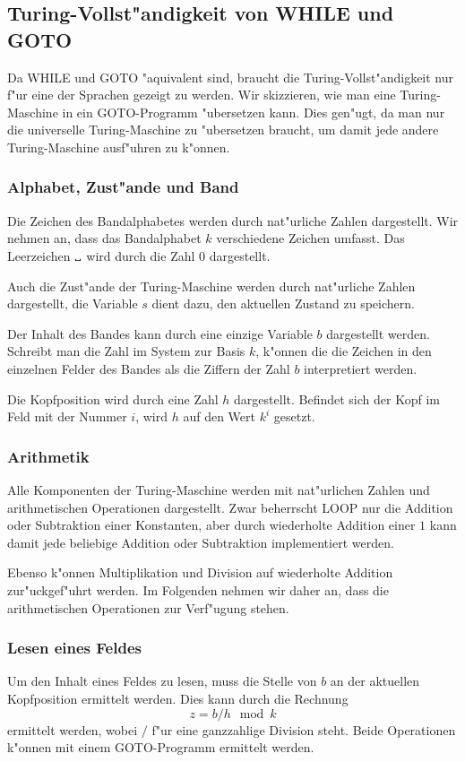 \subsection{Turing-Vollst"andigkeit von WHILE und GOTO}
Da WHILE und GOTO "aquivalent sind, braucht die Turing-Vollst"andigkeit
nur f"ur eine der Sprachen gezeigt zu werden. 
Wir skizzieren, wie man eine Turing-Maschine in ein GOTO-Programm
"ubersetzen kann. Dies gen"ugt, da man nur die universelle
Turing-Maschine zu "ubersetzen braucht, um damit jede andere 
Turing-Maschine ausf"uhren zu k"onnen.

\subsubsection{Alphabet, Zust"ande und Band}
Die Zeichen des Bandalphabetes werden durch nat"urliche Zahlen
dargestellt.  Wir nehmen an, dass das Bandalphabet $k$ verschiedene Zeichen
umfasst. Das Leerzeichen $\text{\textvisiblespace}$ wird durch die Zahl $0$
dargestellt.

Auch die Zust"ande der Turing-Maschine werden durch nat"urliche Zahlen
dargestellt,
die Variable $s$ dient dazu, den aktuellen Zustand zu
speichern.

Der Inhalt des Bandes kann durch eine einzige Variable $b$ dargestellt
werden. Schreibt man die Zahl im System zur Basis $k$, k"onnen die
die Zeichen in den einzelnen Felder des Bandes als die Ziffern 
der Zahl $b$ interpretiert werden.

Die Kopfposition wird durch eine Zahl $h$ dargestellt. Befindet sich
der Kopf im Feld mit der Nummer $i$, wird $h$ auf den Wert $k^i$
gesetzt.

\subsubsection{Arithmetik}
Alle Komponenten der Turing-Maschine werden mit nat"urlichen Zahlen
und arithmetischen Operationen dargestellt.
Zwar beherrscht LOOP nur die Addition oder Subtraktion einer Konstanten,
aber durch wiederholte Addition einer $1$ kann damit jede beliebige 
Addition oder Subtraktion implementiert werden.

Ebenso k"onnen Multiplikation und Division auf wiederholte Addition
zur"uckgef"uhrt werden.
Im Folgenden nehmen wir daher an, dass die arithmetischen Operationen
zur Verf"ugung stehen.

\subsubsection{Lesen eines Feldes}
Um den Inhalt eines Feldes zu lesen, muss die Stelle von $b$ an der
aktuellen Kopfposition ermittelt werden.
Dies kann durch die Rechnung
\begin{equation}
z=b / h \mod k
\label{getchar}
\end{equation}
ermittelt werden, wobei $/$ f"ur eine ganzzahlige Division steht.
Beide Operationen k"onnen mit einem GOTO-Programm ermittelt werden.

